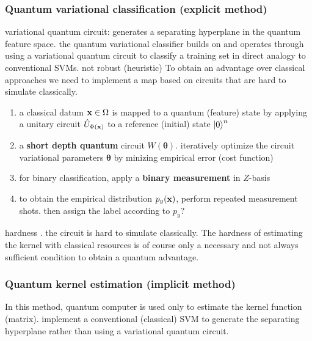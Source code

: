 \subsubsection{Quantum variational classification (explicit method)}
variational quantum circuit: generates a separating hyperplane in the quantum feature space.
the quantum variational classifier builds on \cite{mitaraiQuantumCircuitLearning2018} \cite{farhiClassificationQuantumNeural2018} and operates through using a variational quantum circuit to classify a training set in direct analogy to conventional SVMs.
not robust (heuristic)
To obtain an advantage over classical approaches we need to implement a map based on circuits that are hard to simulate classically.
\begin{enumerate}
	\item a classical datum $\vb{x}\in\Omega$ is mapped to a quantum (feature) state by applying a unitary circuit $\hat{U}_{\Phi(\vb{x})}$ to a reference (initial) state $\ket{0}^n$
	\item a \textbf{short depth quantum} circuit $W(\pmb{\theta})$.
	iteratively optimize the circuit variational parameters $\pmb{\theta}$ 
	by minizing empirical error (cost function)
	\item for binary classification, apply a \textbf{binary measurement} in $Z$-basis
	\item to obtain the empirical distribution $p_y(\vb{x})$, perform repeated measurement shots.
	then assign the label according to $p_y$?
\end{enumerate}
hardness \cite{bremnerAveragecaseComplexityApproximate2016}.
the circuit is hard to simulate classically.
The hardness of estimating the kernel with classical resources is of course only a necessary and not always sufficient condition to obtain a quantum advantage.

\subsubsection{Quantum kernel estimation (implicit method)}
In this method, quantum computer is used only to estimate the kernel function (matrix).
implement a conventional (classical) SVM to generate the separating hyperplane
rather than using a variational quantum circuit.

